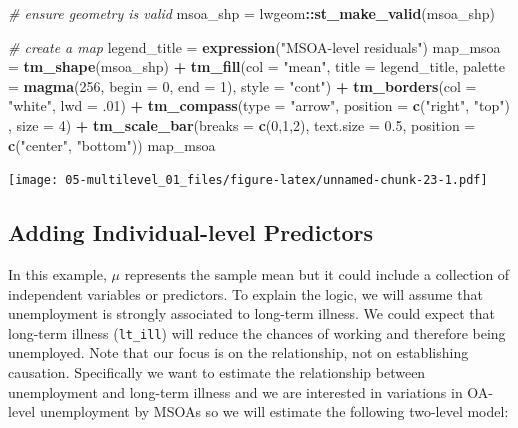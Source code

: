 \documentclass[]{book}
\newenvironment{Shaded}{\begin{snugshade}}{\end{snugshade}}
\newcommand{\KeywordTok}[1]{\textcolor[rgb]{0.13,0.29,0.53}{\textbf{#1}}}
\newcommand{\DataTypeTok}[1]{\textcolor[rgb]{0.13,0.29,0.53}{#1}}
\newcommand{\DecValTok}[1]{\textcolor[rgb]{0.00,0.00,0.81}{#1}}
\newcommand{\FloatTok}[1]{\textcolor[rgb]{0.00,0.00,0.81}{#1}}
\newcommand{\StringTok}[1]{\textcolor[rgb]{0.31,0.60,0.02}{#1}}
\newcommand{\CommentTok}[1]{\textcolor[rgb]{0.56,0.35,0.01}{\textit{#1}}}
\newcommand{\OperatorTok}[1]{\textcolor[rgb]{0.81,0.36,0.00}{\textbf{#1}}}
\newcommand{\NormalTok}[1]{#1}
\begin{document}
\begin{Shaded}
\begin{Highlighting}[]
\CommentTok{# ensure geometry is valid}
\NormalTok{msoa_shp =}\StringTok{ }\NormalTok{lwgeom}\OperatorTok{::}\KeywordTok{st_make_valid}\NormalTok{(msoa_shp)}

\CommentTok{# create a map}
\NormalTok{legend_title =}\StringTok{ }\KeywordTok{expression}\NormalTok{(}\StringTok{"MSOA-level residuals"}\NormalTok{)}
\NormalTok{map_msoa =}\StringTok{ }\KeywordTok{tm_shape}\NormalTok{(msoa_shp) }\OperatorTok{+}
\StringTok{  }\KeywordTok{tm_fill}\NormalTok{(}\DataTypeTok{col =} \StringTok{"mean"}\NormalTok{, }\DataTypeTok{title =}\NormalTok{ legend_title, }\DataTypeTok{palette =} \KeywordTok{magma}\NormalTok{(}\DecValTok{256}\NormalTok{, }\DataTypeTok{begin =} \DecValTok{0}\NormalTok{, }\DataTypeTok{end =} \DecValTok{1}\NormalTok{), }\DataTypeTok{style =} \StringTok{"cont"}\NormalTok{) }\OperatorTok{+}\StringTok{ }
\StringTok{  }\KeywordTok{tm_borders}\NormalTok{(}\DataTypeTok{col =} \StringTok{"white"}\NormalTok{, }\DataTypeTok{lwd =}\NormalTok{ .}\DecValTok{01}\NormalTok{)  }\OperatorTok{+}\StringTok{ }
\StringTok{  }\KeywordTok{tm_compass}\NormalTok{(}\DataTypeTok{type =} \StringTok{"arrow"}\NormalTok{, }\DataTypeTok{position =} \KeywordTok{c}\NormalTok{(}\StringTok{"right"}\NormalTok{, }\StringTok{"top"}\NormalTok{) , }\DataTypeTok{size =} \DecValTok{4}\NormalTok{) }\OperatorTok{+}\StringTok{ }
\StringTok{  }\KeywordTok{tm_scale_bar}\NormalTok{(}\DataTypeTok{breaks =} \KeywordTok{c}\NormalTok{(}\DecValTok{0}\NormalTok{,}\DecValTok{1}\NormalTok{,}\DecValTok{2}\NormalTok{), }\DataTypeTok{text.size =} \FloatTok{0.5}\NormalTok{, }\DataTypeTok{position =}  \KeywordTok{c}\NormalTok{(}\StringTok{"center"}\NormalTok{, }\StringTok{"bottom"}\NormalTok{)) }
\NormalTok{map_msoa}
\end{Highlighting}
\end{Shaded}

\texttt{[image: 05-multilevel\_01\_files/figure-latex/unnamed-chunk-23-1.pdf]}

\hypertarget{adding-individual-level-predictors}{\subsection{Adding
Individual-level Predictors}\label{adding-individual-level-predictors}}

In this example, \(\mu\) represents the sample mean but it could include
a collection of independent variables or predictors. To explain the
logic, we will assume that unemployment is strongly associated to
long-term illness. We could expect that long-term illness
(\texttt{lt\_ill}) will reduce the chances of working and therefore
being unemployed. Note that our focus is on the relationship, not on
establishing causation. Specifically we want to estimate the
relationship between unemployment and long-term illness and we are
interested in variations in OA-level unemployment by MSOAs so we will
estimate the following two-level model:
\end{document}
